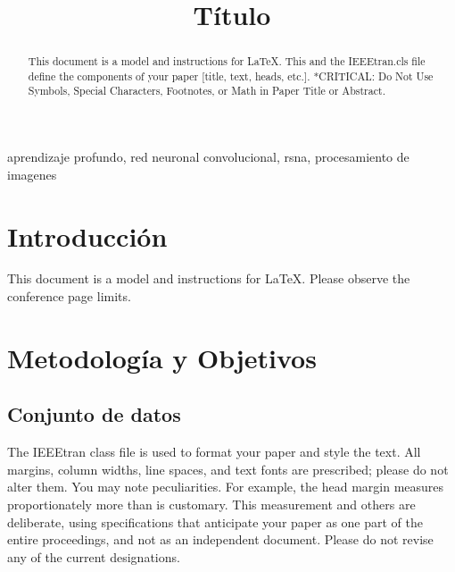 \documentclass[conference]{IEEEtran}
\begin{document}
\title{Título\\
}

\author{
}

\maketitle

\renewcommand{\abstractname}{Abstract} %
\begin{abstract}
This document is a model and instructions for \LaTeX.
This and the IEEEtran.cls file define the components of your paper [title, text, heads, etc.]. *CRITICAL: Do Not Use Symbols, Special Characters, Footnotes, 
or Math in Paper Title or Abstract.
\end{abstract}

\renewcommand{\IEEEkeywordsname}{Palabras Clave} %
\begin{IEEEkeywords}
aprendizaje profundo, red neuronal convolucional, rsna, procesamiento de imagenes
\end{IEEEkeywords}



\section{Introducción}
This document is a model and instructions for \LaTeX.
Please observe the conference page limits. 

\section{Metodología y Objetivos}

\subsection{Conjunto de datos}

The IEEEtran class file is used to format your paper and style the text. All margins, 
column widths, line spaces, and text fonts are prescribed; please do not 
alter them. You may note peculiarities. For example, the head margin
measures proportionately more than is customary. This measurement 
and others are deliberate, using specifications that anticipate your paper 
as one part of the entire proceedings, and not as an independent document. 
Please do not revise any of the current designations.
\end{document}
